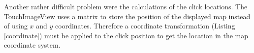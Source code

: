 

Another rather difficult problem were the calculations of the click locations. The TouchImageView uses a matrix to store the position of the displayed map instead of using $x$ and $y$ coordinates. Therefore a coordinate transformation (Listing \ref{coordinate}) must be applied to the click position to get the location in the map coordinate system.


